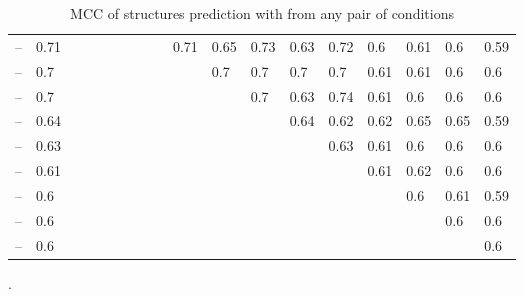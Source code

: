 \documentclass[11pt]{article} %
\begin{document}
{\begin{table}[H]
\begin{adjustbox}{max width=\textwidth,max totalheight=\textheight,keepaspectratio}
\begin{tabular}{lHHHHHHHHHHHHHHHHH}
	 -- \BzCNMg            & 0.71                     &        &        &        &        &        &        &        & 0.71   & 0.65   & 0.73    & 0.63    & 0.72    & 0.6     & 0.61    & 0.6     & 0.59    \\
	 -- \OneMSevMgCE       & 0.7                      &        &        &        &        &        &        &        &        & 0.7    & 0.7     & 0.7     & 0.7     & 0.61    & 0.61    & 0.6     & 0.6     \\
	 -- \CMCTMg           & 0.7                      &        &        &        &        &        &        &        &        &        & 0.7     & 0.63    & 0.74    & 0.61    & 0.6     & 0.6     & 0.6     \\
	 -- \OneMSevILUThree  & 0.64                     &        &        &        &        &        &        &        &        &        &         & 0.64    & 0.62    & 0.62    & 0.65    & 0.65    & 0.59    \\
	 -- \DMSMg            & 0.63                     &        &        &        &        &        &        &        &        &        &         &         & 0.63    & 0.61    & 0.6     & 0.6     & 0.6     \\
	 -- \NMIACE           & 0.61                     &        &        &        &        &        &        &        &        &        &         &         &         & 0.61    & 0.62    & 0.6     & 0.6     \\
	 -- \OneMSevCE        & 0.6                      &        &        &        &        &        &        &        &        &        &         &         &         &         & 0.6     & 0.61    & 0.59    \\
	 -- \BzCN             & 0.6                      &        &        &        &        &        &        &        &        &        &         &         &         &         &         & 0.6     & 0.6     \\
	 -- \NAICE            & 0.6                      &        &        &        &        &        &        &        &        &        &         &         &         &         &         &         & 0.6     \\ \bottomrule
\end{tabular}
\end{adjustbox}
\caption{MCC of structures prediction with \OurTool{} from any pair of conditions}.
\end{table}


}
\end{document}
